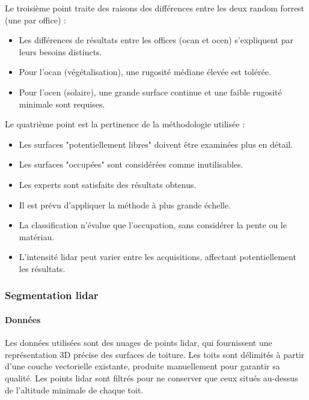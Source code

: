 {{{\par{Le troisième point traite des raisons des différences entre les deux random forrest (une par office) :}
\begin{itemize}
    \item Les différences de résultats entre les offices (\acrshort{ocan} et \acrshort{ocen}) s'expliquent par leurs besoins distincts.
    \item Pour l'\acrshort{ocan} (végétalisation), une rugosité médiane élevée est tolérée.
    \item Pour l'\acrshort{ocen} (solaire), une grande surface continue et une faible rugosité minimale sont requises.
\end{itemize}

\par{Le quatrième point est la pertinence de la méthodologie utilisée :}
\begin{itemize}
    \item Les surfaces "potentiellement libres" doivent être examinées plus en détail.
    \item Les surfaces "occupées" sont considérées comme inutilisables.
    \item Les experts sont satisfaits des résultats obtenus.
    \item Il est prévu d'appliquer la méthode à plus grande échelle.
    \item La classification n'évalue que l'occupation, sans considérer la pente ou le matériau.
    \item L'intensité \gls{lidar} peut varier entre les acquisitions, affectant potentiellement les résultats.
\end{itemize}

\subsubsection{Segmentation \gls{lidar}}

\paragraph{Données}
\par{Les données utilisées sont des nuages de points \gls{lidar}, qui fournissent une représentation 3D précise des surfaces de toiture. Les toits sont délimités à partir d'une couche vectorielle existante, produite manuellement pour garantir sa qualité. Les points \gls{lidar} sont filtrés pour ne conserver que ceux situés au-dessus de l'altitude minimale de chaque toit.}

}}}
